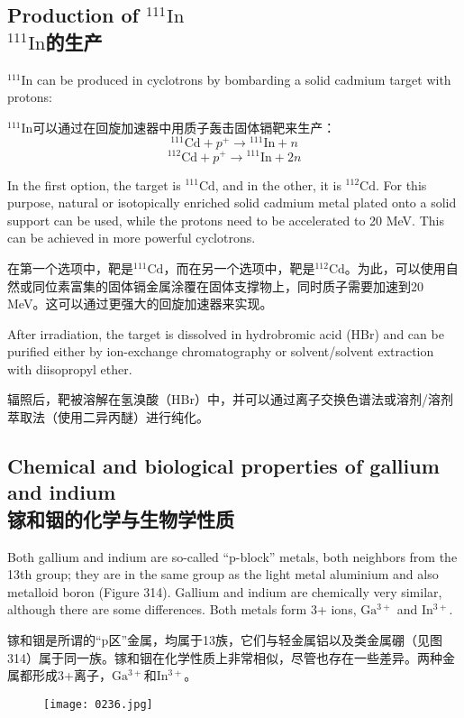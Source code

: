 \documentclass[dvipsnames, svgnames,a4paper,11pt]{article}
\begin{document}
\subsection{Production of \(\mathrm{^{111}In}\)\\ \(\mathrm{^{111}In}\)的生产}  
\(\mathrm{^{111}In}\) can be produced in cyclotrons by bombarding a solid cadmium target with protons:  

\(\mathrm{^{111}In}\)可以通过在回旋加速器中用质子轰击固体镉靶来生产：  
\[\mathrm{^{111}Cd} + p^+ \rightarrow \mathrm{^{111}In} + n\]  
\[\mathrm{^{112}Cd} + p^+ \rightarrow \mathrm{^{111}In} + 2n\] 

In the first option, the target is \(\mathrm{^{111}Cd}\), and in the other, it is \(\mathrm{^{112}Cd}\). For this purpose, natural or isotopically enriched solid cadmium metal plated onto a solid support can be used, while the protons need to be accelerated to 20 MeV. This can be achieved in more powerful cyclotrons.

在第一个选项中，靶是\(\mathrm{^{111}Cd}\)，而在另一个选项中，靶是\(\mathrm{^{112}Cd}\)。为此，可以使用自然或同位素富集的固体镉金属涂覆在固体支撑物上，同时质子需要加速到20 MeV。这可以通过更强大的回旋加速器来实现。

After irradiation, the target is dissolved in hydrobromic acid (HBr) and can be purified either by ion-exchange chromatography or solvent/solvent extraction with diisopropyl ether.

辐照后，靶被溶解在氢溴酸（HBr）中，并可以通过离子交换色谱法或溶剂/溶剂萃取法（使用二异丙醚）进行纯化。

\subsection{Chemical and biological properties of gallium and indium\\ 镓和铟的化学与生物学性质}  
Both gallium and indium are so-called “p-block” metals, both neighbors from the 13th group; they are in the same group as the light metal aluminium and also metalloid boron (Figure 314). Gallium and indium are chemically very similar, although there are some differences. Both metals form 3+ ions, \(\mathrm{Ga^{3+}}\) and \(\mathrm{In^{3+}}\).

镓和铟是所谓的“p区”金属，均属于13族，它们与轻金属铝以及类金属硼（见图314）属于同一族。镓和铟在化学性质上非常相似，尽管也存在一些差异。两种金属都形成3+离子，\(\mathrm{Ga^{3+}}\)和\(\mathrm{In^{3+}}\)。

\begin{figure}[h]
	\centering
    \texttt{[image: 0236.jpg]}  
     \label{fig314}
\end{figure}
\end{document}
